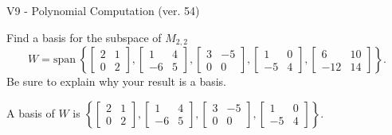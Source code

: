 \begin{exercise}
  \begin{exerciseTitle}V9 - Polynomial Computation (ver. 54)\end{exerciseTitle}
  \begin{exerciseStatement}
    Find a basis for the subspace of \(M_{2,2}\) 
\[W=\mathrm{span}\ \left\{\left[\begin{array}{cc}
2 & 1 \\
0 & 2
\end{array}\right] , \left[\begin{array}{cc}
1 & 4 \\
-6 & 5
\end{array}\right] , \left[\begin{array}{cc}
3 & -5 \\
0 & 0
\end{array}\right] , \left[\begin{array}{cc}
1 & 0 \\
-5 & 4
\end{array}\right] , \left[\begin{array}{cc}
6 & 10 \\
-12 & 14
\end{array}\right]\right\}.\]
 Be sure to explain why your result is a basis.


  \end{exerciseStatement}
  \begin{exerciseAnswer}
   A basis of \(W\) is  \(\left\{\left[\begin{array}{cc}
2 & 1 \\
0 & 2
\end{array}\right] , \left[\begin{array}{cc}
1 & 4 \\
-6 & 5
\end{array}\right] , \left[\begin{array}{cc}
3 & -5 \\
0 & 0
\end{array}\right] , \left[\begin{array}{cc}
1 & 0 \\
-5 & 4
\end{array}\right]\right\}\).
  


  \end{exerciseAnswer}
\end{exercise}